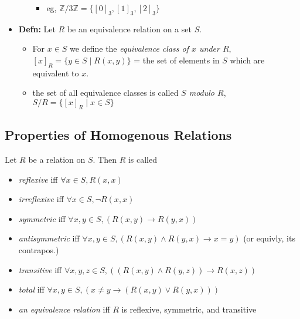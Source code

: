 \documentclass[11pt]{article}
\theoremstyle{definition}
\newcommand{\bb}[1]{\mathbb{#1}}
\begin{document}
\begin{itemize}
\begin{itemize}
        \begin{itemize}
            \item eg, $\bb{Z}/3\bb{Z} = \{[0]_3,[1]_3,[2]_3\}$
        \end{itemize}
    \end{itemize}
    \item \textbf{Defn:} Let $R$ be an equivalence relation on a set $S$.
    \begin{itemize}
        \item For $x\in S$ we define the \emph{equivalence class of $x$ under $R$}, $[x]_R=\{y\in S\mid R(x,y)\}$ = the set of elements in $S$ which are equivalent to $x$.
        \item the set of all equivalence classes is called \emph{$S$ modulo $R$}, $S/R=\{[x]_R\mid x\in S\}$
    \end{itemize}
\end{itemize}
\newpage
\subsection*{Properties of Homogenous Relations}
Let $R$ be a relation on $S$. Then $R$ is called
\begin{itemize}
    \item \emph{reflexive} iff $\forall x\in S, R(x,x)$
    \item \emph{irreflexive} iff $\forall x\in S, \neg R(x,x)$
    \item \emph{symmetric} iff $\forall x,y \in S, (R(x,y)\rightarrow R(y,x))$
    \item \emph{antisymmetric} iff $\forall x,y\in S, (R(x,y) \land R(y,x) \rightarrow x=y)$ (or equivly, its contrapos.)
    \item \emph{transitive} iff $\forall x,y,z\in S, ((R(x,y)\land R(y,z)) \rightarrow R(x,z))$
    \item \emph{total} iff $\forall x,y\in S, (x\ne y\rightarrow (R(x,y)\lor R(y,x)))$
    \item \emph{an equivalence relation} iff $R$ is reflexive, symmetric, and transitive
\end{itemize}
\end{document}
